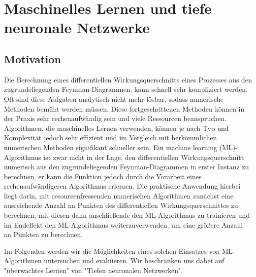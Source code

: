 \chapter{Maschinelles Lernen und tiefe neuronale Netzwerke}
\section{Motivation}
Die Berechnung eines differentiellen Wirkungsquerschnitts eines Prozesses aus den zugrundeliegenden Feynman-Diagrammen, kann schnell sehr kompliziert werden. Oft sind diese Aufgaben analytisch nicht mehr lösbar, sodass numerische Methoden bemüht werden müssen. Diese fortgeschrittenen Methoden können in der Praxis sehr rechenaufwändig sein und viele Ressourcen beanspruchen. Algorithmen, die maschinelles Lernen verwenden, können je nach Typ und Komplexität jedoch sehr effizient und im Vergleich mit herkömmlichen numerischen Methoden signifikant schneller sein. Ein machine learning (ML)-Algorithmus ist zwar nicht in der Lage, den differentiellen Wirkungsquerschnitt numerisch aus den zugrundeliegenden Feynman-Diagrammen in erster Instanz zu berechnen, er kann die Funktion jedoch durch die Vorarbeit eines rechenaufwändigeren Algorithmus erlernen. Die praktische Anwendung hierbei liegt darin, mit resourcenfressenden numerischen Algorithmen zunächst eine ausreichende Anzahl an Punkten des differentiellen Wirkungsquerschnittes zu berechnen, mit diesen dann anschließende den ML-Algorithmus zu trainieren und im Endeffekt den ML-Algorithmus weiterzuverwenden, um eine größere Anzahl an Punkten zu berechnen.

Im Folgenden werden wir die Möglichkeiten eines solchen Einsatzes von ML-Algorithmen untersuchen und evaluieren. Wir beschränken uns dabei auf "überwachtes Lernen" von "Tiefen neuronalen Netzwerken". 
